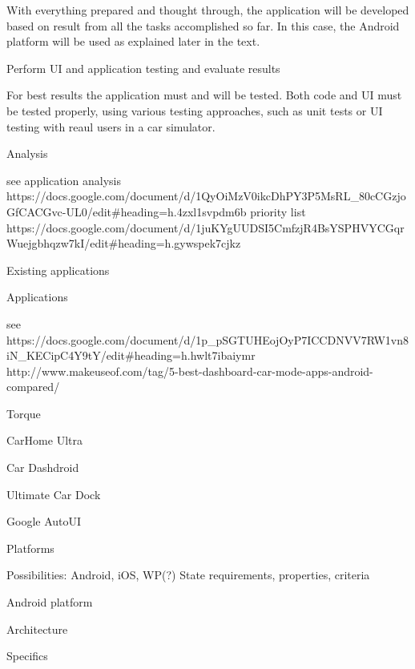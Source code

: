 With everything prepared and thought through, the application will be developed based on result from all the tasks accomplished so far. In this case, the Android platform will be used as explained later in the text.

\secc Perform UI and application testing and evaluate results

For best results the application must and will be tested. Both code and UI must be tested properly, using various testing approaches, such as unit tests or UI testing with reaul users in a car simulator.

\chap Analysis

see application analysis https://docs.google.com/document/d/1QyOiMzV0ikcDhPY3P5MsRL_80cCGzjoGfCACGvc-UL0/edit#heading=h.4zxl1svpdm6b
priority list https://docs.google.com/document/d/1juKYgUUDSI5CmfzjR4BsYSPHVYCGqrWuejgbhqzw7kI/edit#heading=h.gywspek7cjkz

\sec Existing applications


\secc Applications

see https://docs.google.com/document/d/1p_pSGTUHEojOyP7ICCDNVV7RW1vn8iN_KECipC4Y9tY/edit#heading=h.hwlt7ibaiymr
http://www.makeuseof.com/tag/5-best-dashboard-car-mode-apps-android-compared/

\secc Torque

\secc CarHome Ultra

\secc Car Dashdroid

\secc Ultimate Car Dock

\secc Google AutoUI


\sec Platforms

Possibilities: Android, iOS, WP(?)
State requirements, properties, criteria

\sec Android platform


\secc Architecture


\secc Specifics


